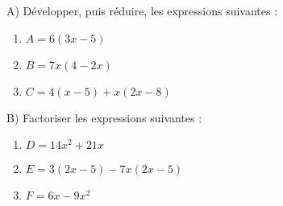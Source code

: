 \begin{minipage}{0.99\linewidth}

\exo



A) Développer, puis réduire, les expressions suivantes :

\begin{multicols}{3}

\begin{enumerate}

\item $ A = 6(3x-5) $ 
\item $ B = 7x(4-2x) $ 
\item $ C = 4(x-5)+x(2x-8) $ 

\end{enumerate}

\end{multicols}

B) Factoriser les expressions suivantes :

\begin{multicols}{3}

\begin{enumerate}

\item $ D = 14x^2+21x $ 
\item $ E = 3(2x-5) - 7x(2x-5) $ 
\item $ F = 6x-9x^2$ 

\end{enumerate}

\end{multicols}

\end{minipage}

\vspace{0.5cm}
